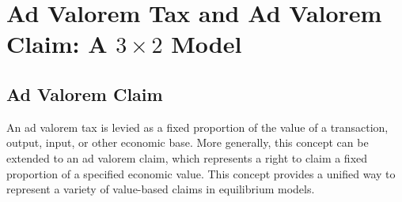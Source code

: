 \documentclass[
  letterpaper,
  DIV=11,
  numbers=noendperiod]{scrreprt}
\newenvironment{Shaded}{\begin{snugshade}}{\end{snugshade}}
\newcommand{\FloatTok}[1]{\textcolor[rgb]{0.68,0.00,0.00}{#1}}
\newcommand{\FunctionTok}[1]{\textcolor[rgb]{0.28,0.35,0.67}{#1}}
\newcommand{\NormalTok}[1]{\textcolor[rgb]{0.00,0.23,0.31}{#1}}
\newcommand{\OperatorTok}[1]{\textcolor[rgb]{0.37,0.37,0.37}{#1}}
\newcommand{\StringTok}[1]{\textcolor[rgb]{0.13,0.47,0.30}{#1}}
\begin{document}
%

\section{\texorpdfstring{Ad Valorem Tax and Ad Valorem Claim: A
\(3\times2\)
Model}{Ad Valorem Tax and Ad Valorem Claim: A 3\textbackslash times2 Model}}\label{ad-valorem-tax-and-ad-valorem-claim-a-3times2-model}

\subsection{Ad Valorem Claim}\label{ad-valorem-claim}

An ad valorem tax is levied as a fixed proportion of the value of a
transaction, output, input, or other economic base. More generally, this
concept can be extended to an ad valorem claim, which represents a right
to claim a fixed proportion of a specified economic value. This concept
provides a unified way to represent a variety of value-based claims in
equilibrium models.
\end{document}
